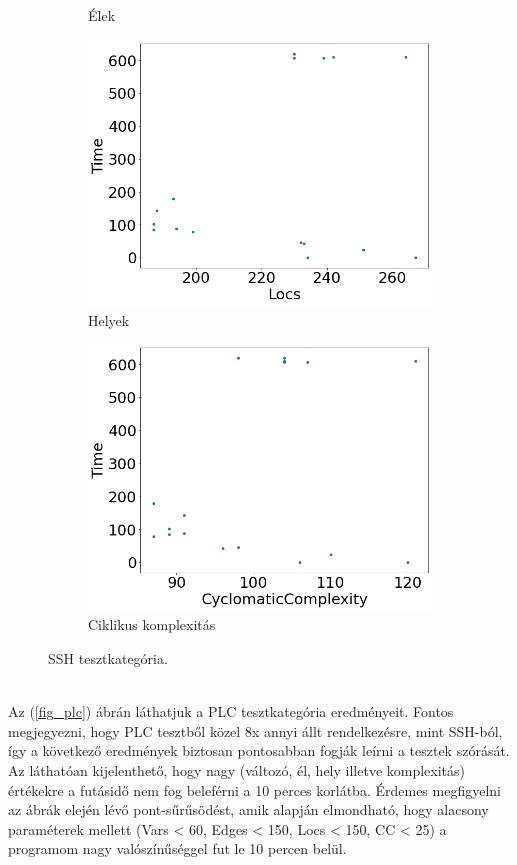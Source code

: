 \begin{figure}[ht]
\begin{subfigure}[b]{0.5\linewidth}
		\caption{Élek} 
		\vspace{4ex}
	\end{subfigure} 
	\begin{subfigure}[b]{0.5\linewidth}
		\centering
		\includegraphics[width=0.95\linewidth]{figures/ssh/locs.png} 
		\caption{Helyek} 
	\end{subfigure}%
	\begin{subfigure}[b]{0.5\linewidth}
		\centering
		\includegraphics[width=0.95\linewidth]{figures/ssh/cc.png} 
		\caption{Ciklikus komplexitás} 
	\end{subfigure} 
	\caption{SSH tesztkategória.}
	\label{fig_ssh} 
\end{figure}
\ \\
Az (\ref{fig_plc}) ábrán láthatjuk a PLC tesztkategória eredményeit. Fontos megjegyezni, hogy PLC tesztből közel 8x annyi állt rendelkezésre, mint SSH-ból, így a következő eredmények biztosan pontosabban fogják leírni a tesztek szórását. Az láthatóan kijelenthető, hogy nagy (változó, él, hely illetve komplexitás) értékekre a futásidő nem fog beleférni a 10 perces korlátba. Érdemes megfigyelni az ábrák elején lévő pont-sűrűsödést, amik alapján elmondható, hogy alacsony paraméterek mellett (Vars < 60, Edges < 150, Locs < 150, CC < 25) a programom nagy valószínűséggel fut le 10 percen belül. 


